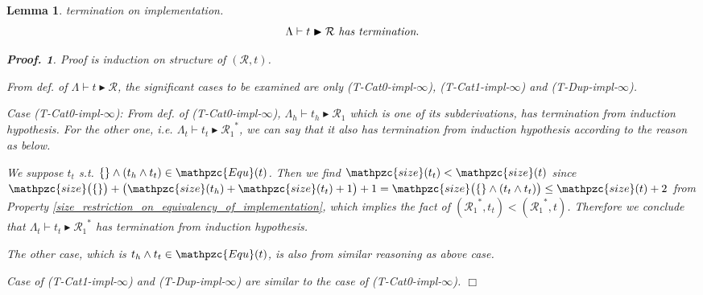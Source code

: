 \documentclass[12pt]{article}
\newtheorem{Lemma}{Lemma}[section]
\newtheorem{Proof}{Proof.}
\begin{document}
\pagebreak
\begin{Lemma}{termination on implementation.}
  \[ \Lambda \vdash t \blacktriangleright \mathcal{R}\
      \text{\it has termination}.
  \]
  \begin{Proof}
    Proof is induction on structure of $(\mathcal{R}, t)$.
    
    From def. of $\Lambda \vdash t \blacktriangleright \mathcal{R}$,
    the significant cases to be examined are only (T-Cat0-impl-$\infty$),
    (T-Cat1-impl-$\infty$) and (T-Dup-impl-$\infty$).
    
    Case (T-Cat0-impl-$\infty$):
    From def. of (T-Cat0-impl-$\infty$),
    $\Lambda_h \vdash t_h \blacktriangleright \mathcal{R}_1$ which
    is one of its subderivations, has termination from induction
    hypothesis. For the other one, i.e.
    $\Lambda_t \vdash t_t \blacktriangleright {\mathcal{R}_1}^*$, we can
    say that it also has termination from induction hypothesis
    according to the reason as below.
    
    We suppose $t_t$ s.t.
    $\{\} \wedge (t_h \wedge t_t) \in \mathpzc{Equ}(t)$. Then we find
    $\mathpzc{size}(t_t) < \mathpzc{size}(t)$ since
    $\mathpzc{size}\bigl(\{\} \bigr) + \bigl(\mathpzc{size}(t_h) +
    \mathpzc{size}(t_t) + 1\bigr) + 1 =
    \mathpzc{size}\bigl(\{\} \wedge (t_t \wedge t_t) \bigr) \le
    \mathpzc{size}(t) + 2$ from Property
    \ref{size_restriction_on_equivalency_of_implementation},
    which implies the fact of
    $({\mathcal{R}_1}^*, t_t) < ({\mathcal{R}_1}^*, t)$. Therefore
    we conclude that
    $\Lambda_t \vdash t_t \blacktriangleright {\mathcal{R}_1}^*$ has
    termination from induction hypothesis.
    
    The other case, which is $t_h \wedge t_t\in \mathpzc{Equ}(t)$, is
    also from similar reasoning as above case.
    
    Case of (T-Cat1-impl-$\infty$) and (T-Dup-impl-$\infty$) are
    similar to the case of (T-Cat0-impl-$\infty$).
    $\Box$
  \end{Proof}
\end{Lemma}
\end{document}
